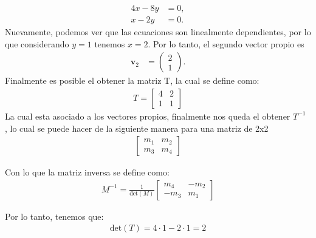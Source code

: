 \documentclass[
  11pt,
  letterpaper,
   addpoints,
   answers
  ]{exam}
\begin{document}
\begin{questions}
\begin{solution}
    \begin{align}
        4x - 8y &= 0, \\
        x - 2y &= 0.
    \end{align}
    Nuevamente, podemos ver que las ecuaciones son linealmente dependientes, por lo que considerando \( y = 1 \) tenemos \( x = 2 \). Por lo tanto, el segundo vector propio es
    \begin{align}
        \mathbf{v}_2 &= \begin{pmatrix} 2 \\ 1 \end{pmatrix}.
    \end{align}
    Finalmente es posible el obtener la matriz T, la cual se define como:
    \begin{align}
        T = \begin{bmatrix}
            4 & 2\\
            1 & 1
        \end{bmatrix}
    \end{align}
    La cual esta asociado a los vectores propios, finalmente nos queda el obtener $T^{-1}$ , lo cual se puede hacer de la siguiente manera para una matriz de 2x2 
    \begin{align}
        \begin{bmatrix}
            m_{1} & m_{2}\\
            m_{3} & m_{4}
        \end{bmatrix}
    \end{align}
    
    Con lo que la matriz inversa se define como:
    \begin{align}
        M^{-1} = \frac{1}{\text{det}(M)}\begin{bmatrix}
            m_{4} & -m_{2}\\
            -m_{3} & m_{1}
        \end{bmatrix}
    \end{align}
    
    Por lo tanto, tenemos que:
    \begin{align}
        \text{det}(T) = 4 \cdot 1 - 2 \cdot 1 = 2
    \end{align}
    

\end{solution}
\end{questions}
\end{document}
